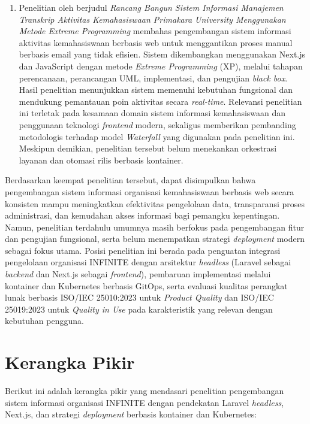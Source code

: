 \begin{enumerate}
  \item Penelitian oleh \citet{Feriawan_Paramitha_Dewi_2024_TAKPrimakara} berjudul \textit{Rancang Bangun Sistem Informasi Manajemen Transkrip Aktivitas Kemahasiswaan Primakara University Menggunakan Metode Extreme Programming} membahas pengembangan sistem informasi aktivitas kemahasiswaan berbasis web untuk menggantikan proses manual berbasis email yang tidak efisien. Sistem dikembangkan menggunakan Next.js dan JavaScript dengan metode \textit{Extreme Programming} (XP), melalui tahapan perencanaan, perancangan UML, implementasi, dan pengujian \textit{black box}. Hasil penelitian menunjukkan sistem memenuhi kebutuhan fungsional dan mendukung pemantauan poin aktivitas secara \textit{real-time}. Relevansi penelitian ini terletak pada kesamaan domain sistem informasi kemahasiswaan dan penggunaan teknologi \textit{frontend} modern, sekaligus memberikan pembanding metodologis terhadap model \textit{Waterfall} yang digunakan pada penelitian ini. Meskipun demikian, penelitian tersebut belum menekankan orkestrasi layanan dan otomasi rilis berbasis kontainer.
\end{enumerate}

Berdasarkan keempat penelitian tersebut, dapat disimpulkan bahwa pengembangan sistem informasi organisasi kemahasiswaan berbasis web secara konsisten mampu meningkatkan efektivitas pengelolaan data, transparansi proses administrasi, dan kemudahan akses informasi bagi pemangku kepentingan. Namun, penelitian terdahulu umumnya masih berfokus pada pengembangan fitur dan pengujian fungsional, serta belum menempatkan strategi \textit{deployment} modern sebagai fokus utama. Posisi penelitian ini berada pada penguatan integrasi pengelolaan organisasi INFINITE dengan arsitektur \textit{headless} (Laravel sebagai \textit{backend} dan Next.js sebagai \textit{frontend}), pembaruan implementasi melalui kontainer dan Kubernetes berbasis GitOps, serta evaluasi kualitas perangkat lunak berbasis ISO/IEC 25010:2023 untuk \textit{Product Quality} dan ISO/IEC 25019:2023 untuk \textit{Quality in Use} pada karakteristik yang relevan dengan kebutuhan pengguna.

\section{Kerangka Pikir}

Berikut ini adalah kerangka pikir yang mendasari penelitian pengembangan sistem informasi organisasi INFINITE dengan pendekatan Laravel \textit{headless}, Next.js, dan strategi \textit{deployment} berbasis kontainer dan Kubernetes:

